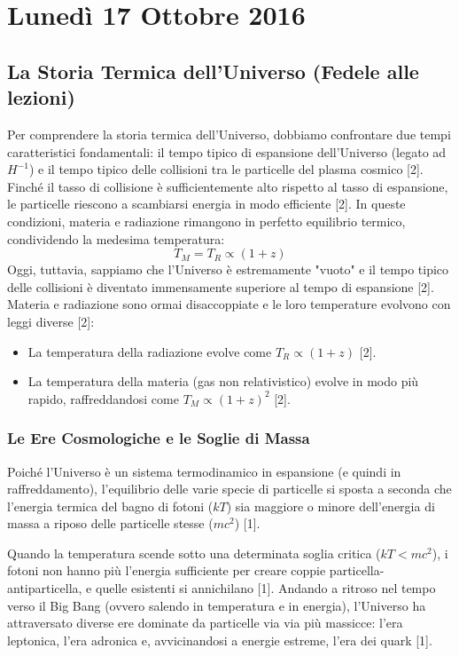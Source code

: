 \documentclass[11pt,a4paper]{report}
\begin{document}
\chapter{Lunedì 17 Ottobre 2016}

\section{La Storia Termica dell'Universo (Fedele alle lezioni)}

Per comprendere la storia termica dell'Universo, dobbiamo confrontare due tempi caratteristici fondamentali: il tempo tipico di espansione dell'Universo (legato ad $H^{-1}$) e il tempo tipico delle collisioni tra le particelle del plasma cosmico [2]. 
Finché il tasso di collisione è sufficientemente alto rispetto al tasso di espansione, le particelle riescono a scambiarsi energia in modo efficiente [2]. In queste condizioni, materia e radiazione rimangono in perfetto equilibrio termico, condividendo la medesima temperatura:
\begin{equation}
T_M = T_R \propto (1+z)
\end{equation}
Oggi, tuttavia, sappiamo che l'Universo è estremamente "vuoto" e il tempo tipico delle collisioni è diventato immensamente superiore al tempo di espansione [2]. Materia e radiazione sono ormai disaccoppiate e le loro temperature evolvono con leggi diverse [2]:
\begin{itemize}
    \item La temperatura della radiazione evolve come $T_R \propto (1+z)$ [2].
    \item La temperatura della materia (gas non relativistico) evolve in modo più rapido, raffreddandosi come $T_M \propto (1+z)^2$ [2].
\end{itemize}

\subsection{Le Ere Cosmologiche e le Soglie di Massa}
Poiché l'Universo è un sistema termodinamico in espansione (e quindi in raffreddamento), l'equilibrio delle varie specie di particelle si sposta a seconda che l'energia termica del bagno di fotoni ($kT$) sia maggiore o minore dell'energia di massa a riposo delle particelle stesse ($mc^2$) [1]. 

Quando la temperatura scende sotto una determinata soglia critica ($kT < mc^2$), i fotoni non hanno più l'energia sufficiente per creare coppie particella-antiparticella, e quelle esistenti si annichilano [1]. 
Andando a ritroso nel tempo verso il Big Bang (ovvero salendo in temperatura e in energia), l'Universo ha attraversato diverse ere dominate da particelle via via più massicce: l'era leptonica, l'era adronica e, avvicinandosi a energie estreme, l'era dei quark [1].
\end{document}
